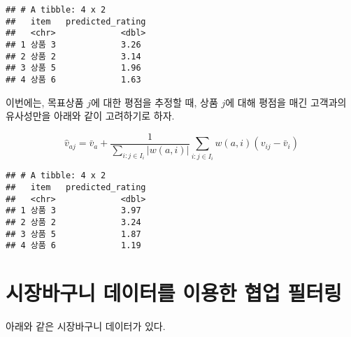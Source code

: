 \documentclass[]{book}
\newenvironment{Shaded}{\begin{snugshade}}{\end{snugshade}}
\newcommand{\DataTypeTok}[1]{\textcolor[rgb]{0.13,0.29,0.53}{#1}}
\newcommand{\KeywordTok}[1]{\textcolor[rgb]{0.13,0.29,0.53}{\textbf{#1}}}
\newcommand{\NormalTok}[1]{#1}
\newcommand{\OperatorTok}[1]{\textcolor[rgb]{0.81,0.36,0.00}{\textbf{#1}}}
\newcommand{\StringTok}[1]{\textcolor[rgb]{0.31,0.60,0.02}{#1}}
\begin{document}
\begin{verbatim}
## # A tibble: 4 x 2
##   item   predicted_rating
##   <chr>             <dbl>
## 1 상품 3             3.26
## 2 상품 2             3.14
## 3 상품 5             1.96
## 4 상품 6             1.63
\end{verbatim}

이번에는, 목표상품 \(j\)에 대한 평점을 추정할 때, 상품 \(j\)에 대해 평점을 매긴 고객과의 유사성만을 아래와 같이 고려하기로 하자.

\begin{equation*}
\hat{v}_{aj} = \bar{v}_a + \frac{1}{\sum_{i: j \in I_i} \left| w(a, i) \right|} \sum_{i: j \in I_i} w(a, i) (v_{ij} - \bar{v}_i)
\end{equation*}

\begin{Shaded}
\end{Shaded}

\begin{verbatim}
## # A tibble: 4 x 2
##   item   predicted_rating
##   <chr>             <dbl>
## 1 상품 3             3.97
## 2 상품 2             3.24
## 3 상품 5             1.87
## 4 상품 6             1.19
\end{verbatim}

\hypertarget{market-basket}{%
\section{시장바구니 데이터를 이용한 협업 필터링}\label{market-basket}}

아래와 같은 시장바구니 데이터가 있다.
\end{document}
